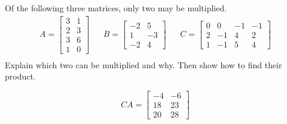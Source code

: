 
\begin{exerciseStatement}


Of the following three matrices, only two may be multiplied. 
\begin{align*} A= \left[\begin{array}{cc}
3 & 1 \\
2 & 3 \\
3 & 6 \\
1 & 0
\end{array}\right]  & & B= \left[\begin{array}{cc}
-2 & 5 \\
1 & -3 \\
-2 & 4
\end{array}\right]  & & C= \left[\begin{array}{cccc}
0 & 0 & -1 & -1 \\
2 & -1 & 4 & 2 \\
1 & -1 & 5 & 4
\end{array}\right]  \\ \end{align*}
             Explain which two can be multiplied and why. Then show how to find their product.


\end{exerciseStatement}
    
\begin{exerciseAnswer} 
\[CA= \left[\begin{array}{cc}
-4 & -6 \\
18 & 23 \\
20 & 28
\end{array}\right] \]
\end{exerciseAnswer}
    
